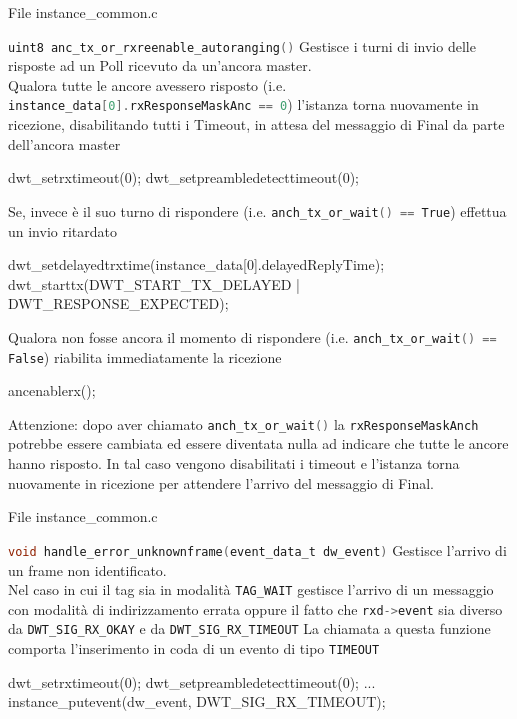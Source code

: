 \begin{frame}[fragile,shrink=30]{File instance\_common.c}
  \begin{block}{\lstinline[language=C]!uint8 anc_tx_or_rxreenable_autoranging()!}
    Gestisce i turni di invio delle risposte ad un Poll ricevuto da un'ancora master.\\
    Qualora tutte le ancore avessero risposto (i.e. \lstinline[language=C]!instance_data[0].rxResponseMaskAnc == 0!) l'istanza torna nuovamente in ricezione, disabilitando tutti i
    Timeout, in attesa del messaggio di Final da parte dell'ancora master 
    \begin{C}
      dwt_setrxtimeout(0);
      dwt_setpreambledetecttimeout(0);
    \end{C}
    Se, invece è il suo turno di rispondere (i.e. \lstinline[language=C]!anch_tx_or_wait() == True!) effettua un invio ritardato
    \begin{C}
      dwt_setdelayedtrxtime(instance_data[0].delayedReplyTime);
      dwt_starttx(DWT_START_TX_DELAYED | DWT_RESPONSE_EXPECTED);
    \end{C}
    Qualora non fosse ancora il momento di rispondere (i.e. \lstinline[language=C]!anch_tx_or_wait() == False!) riabilita immediatamente la ricezione
    \begin{C}
      ancenablerx();
    \end{C}    
    \textcolor{dgreen}{Attenzione:} dopo aver chiamato \lstinline[language=C]!anch_tx_or_wait()! la \lstinline[language=C]!rxResponseMaskAnch! potrebbe essere cambiata ed essere diventata
    nulla ad indicare che tutte le ancore hanno risposto. In tal caso vengono disabilitati i timeout e l'istanza torna nuovamente in ricezione per attendere l'arrivo del messaggio di Final.
  \end{block}
\end{frame}

\begin{frame}[fragile]{File instance\_common.c}
  \begin{block}{\lstinline[language=C]!void handle_error_unknownframe(event_data_t dw_event)!}
    Gestisce l'arrivo di un frame non identificato.\\
    Nel caso in cui il tag sia in modalità \lstinline[language=C]!TAG_WAIT! gestisce l'arrivo di un messaggio con modalità di indirizzamento
    errata oppure il fatto che \lstinline[language=C]!rxd->event! sia diverso da \lstinline[language=C]!DWT_SIG_RX_OKAY! e da \lstinline[language=C]!DWT_SIG_RX_TIMEOUT!
    La chiamata a questa funzione comporta l'inserimento in coda di un evento di tipo \lstinline[language=C]!TIMEOUT!
    \begin{C}
      dwt_setrxtimeout(0);
      dwt_setpreambledetecttimeout(0);
      ...
      instance_putevent(dw_event, DWT_SIG_RX_TIMEOUT);
    \end{C}
  \end{block}
\end{frame}

